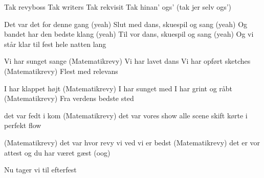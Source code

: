 \documentclass[a4paper,11pt]{article}
\begin{document}
\begin{song}
Tak revyboss
Tak writers
Tak rekvisit
Tak hinan’ ogs’ (tak jer selv ogs’)

 Det var det for denne gang (yeah)
Slut med dans, skuespil og sang (yeah)
Og bandet har den bedste klang (yeah)
Til vor dans, skuespil og sang (yeah)
Og vi står klar til fest hele natten lang

 Vi har sunget sange (Matematikrevy)
Vi har lavet dans
Vi har opført sketches (Matematikrevy)
Flest med relevans

 I har klappet højt (Matematikrevy)
I har sunget med
I har grint og råbt (Matematikrevy)
Fra verdens bedste sted

det var fedt i kom (Matematikrevy)
det var vores show
alle scene skift 
kørte i perfekt flow

(Matematikrevy)
det var hvor revy 
vi ved vi er bedst 
(Matematikrevy)
det er vor attest
og du har været gæst (oog)


 Nu tager vi til efterfest 
\end{song}
\end{document}
